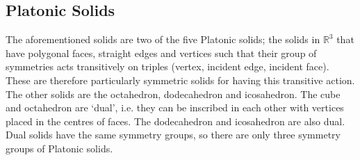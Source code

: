 \subsection{Platonic Solids}
The aforementioned solids are two of the five Platonic solids; the solids in $\mathbb R^3$ that have polygonal faces, straight edges and vertices such that their group of symmetries acts transitively on triples (vertex, incident edge, incident face). These are therefore particularly symmetric solids for having this transitive action. The other solids are the octahedron, dodecahedron and icosahedron. The cube and octahedron are `dual', i.e. they can be inscribed in each other with vertices placed in the centres of faces. The dodecahedron and icosahedron are also dual. Dual solids have the same symmetry groups, so there are only three symmetry groups of Platonic solids.

